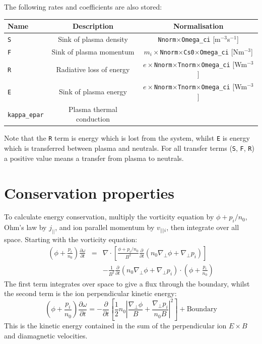 \documentclass[12pt,a4paper]{article}
\begin{document}
\noindent The following rates and coefficients are also stored:
\begin{center}
\begin{tabular}{l c c}
  Name & Description & Normalisation \\
  \hline
  \texttt{S} & Sink of plasma density & \texttt{Nnorm}$\times$\texttt{Omega\_ci} [m$^{-3}$s$^{-1}$] \\
  \texttt{F} & Sink of plasma momentum & $m_i\times$\texttt{Nnorm}$\times$\texttt{Cs0}$\times$\texttt{Omega\_ci} [Nm$^{-3}$] \\
  \texttt{R} & Radiative loss of energy & $e\times$\texttt{Nnorm}$\times$\texttt{Tnorm}$\times$\texttt{Omega\_ci} [Wm$^{-3}$] \\
  \texttt{E} & Sink of plasma energy & $e\times$\texttt{Nnorm}$\times$\texttt{Tnorm}$\times$\texttt{Omega\_ci} [Wm$^{-3}$] \\
  \texttt{kappa\_epar} & Plasma thermal conduction & \\ 
  \hline
\end{tabular}
\end{center}
Note that the \texttt{R} term is energy which is lost from the system, whilst \texttt{E} is energy which is
transferred between plasma and neutrals. For all transfer terms (\texttt{S}, \texttt{F}, \texttt{R}) a positive value means
a transfer from plasma to neutrals.


\section{Conservation properties}
\label{sec:conservation}

To calculate energy conservation, multiply the vorticity equation by $\phi + p_i/n_0$, Ohm's law by $j_{||}$, and ion parallel momentum by $v_{|||i}$, then integrate over all space. Starting with the vorticity equation:
\begin{eqnarray*}
\left(\phi + \frac{p_i}{n_0}\right)\frac{\partial\omega}{\partial t} &=& \nabla\cdot\left[\frac{\phi + p_i/n_0}{B^2}\frac{\partial}{\partial t}\left(n_0\nabla_\perp\phi + \nabla_\perp p_i\right)\right] \\
&& - \frac{1}{B^2}\frac{\partial}{\partial t}\left(n_0\nabla_\perp\phi + \nabla_\perp p_i\right)\cdot\left(\phi + \frac{p_i}{n_0}\right)
\end{eqnarray*}
The first term integrates over space to give a flux through the boundary, whilst the second term is the ion perpendicular kinetic energy:
\[
\left(\phi + \frac{p_i}{n_0}\right)\frac{\partial\omega}{\partial t} = -\frac{\partial}{\partial t}\left[\frac{1}{2}n_0\left|\frac{\nabla_\perp\phi}{B} + \frac{\nabla_\perp p_i}{n_0B}\right|^2\right] + \mathrm{Boundary}
\]
This is the kinetic energy contained in the sum of the perpendicular ion $E\times B$ and diamagnetic velocities.
\end{document}
